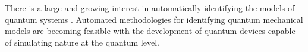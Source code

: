 There is a large and growing interest in automatically identifying the models of quantum systems 
\cite{rigo2020machine, cranmer2020discovering, bairey2019learning, pickard2011ab, chertkov2018computational}.
Automated methodologies for identifying quantum mechanical models are becoming feasible with the development of 
quantum devices capable of simulating nature at the quantum level. 